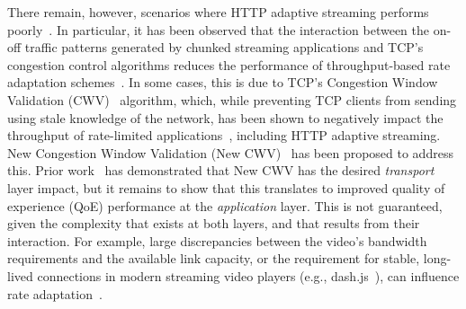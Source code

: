 \documentclass[10pt,sigconf,anonymous]{acmart}
\begin{document}
There remain, however, scenarios where HTTP adaptive streaming performs poorly~\cite{Spiteri-2016-BOLA,Kua-2017-a-survey-rate-adaptation-dash}. In particular, it has been observed that the interaction between the on-off traffic patterns generated by chunked streaming applications and TCP's congestion control algorithms reduces the performance of throughput-based rate adaptation schemes~\cite{Akhshabi-2012-http-adaptive-players-compete,Stohr-2017-where-are-the-sweet-spots-maci}. In some cases, this is due to TCP's Congestion Window Validation (CWV)~\cite{rfc2861-2000-padhye-congestion-window-validation} algorithm, which, while preventing TCP clients from sending using stale knowledge of the network, has been shown to negatively impact the throughput of rate-limited applications~\cite{Nazir-2014-performance-evaluation-congestion-window-validation-dash-newcwv}, including HTTP adaptive streaming. New Congestion Window Validation (New CWV)~\cite{rfc7661-2015-fairhurst-new-cwnd-validation} has been proposed to address this. Prior work~\cite{Nazir-2014-performance-evaluation-congestion-window-validation-dash-newcwv} has demonstrated that New CWV has the desired \emph{transport} layer impact, but it remains to show that this translates to improved quality of experience (QoE) performance at the \emph{application} layer. This is not guaranteed, given the complexity that exists at both layers, and that results from their interaction. For example, large discrepancies between the video's bandwidth requirements and the available link capacity, or the requirement for stable, long-lived connections in modern streaming video players (e.g., dash.js~\cite{online-dashjs}), can influence rate adaptation~\cite{Spiteri-2019-from-theory-to-practice-sabre}.



\end{document}
